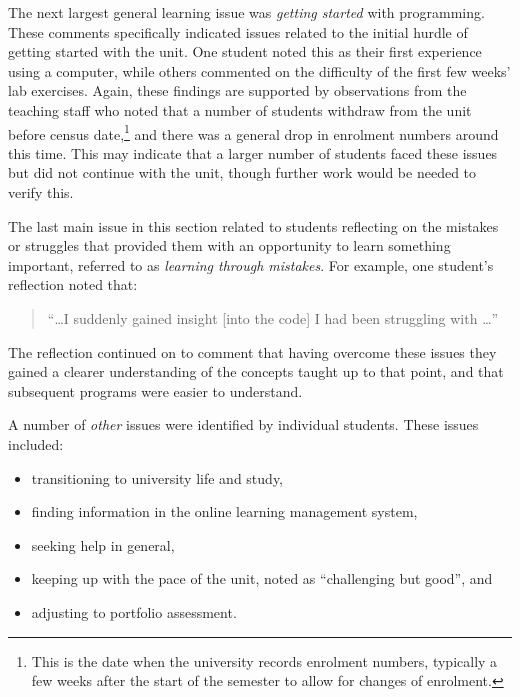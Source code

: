 The next largest general learning issue was \emph{getting started} with programming. These comments specifically indicated issues related to the initial hurdle of getting started with the unit. One student noted this as their first experience using a computer, while others commented on the difficulty of the first few weeks' lab exercises. Again, these findings are supported by observations from the teaching staff who noted that a number of students withdraw from the unit before census date,\footnote{This is the date when the university records enrolment numbers, typically a few weeks after the start of the semester to allow for changes of enrolment.} and there was a general drop in enrolment numbers around this time. This may indicate that a larger number of students faced these issues but did not continue with the unit, though further work would be needed to verify this.


The last main issue in this section related to students reflecting on the mistakes or struggles that provided them with an opportunity to learn something important, referred to as \emph{learning through mistakes}. For example, one student's reflection noted that:

\begin{quote}
``\ldots I suddenly gained insight [into the code] I had been struggling with \ldots''
\end{quote}

\noindent The reflection continued on to comment that having overcome these issues they gained a clearer understanding of the concepts taught up to that point, and that subsequent programs were easier to understand. 

A number of \emph{other} issues were identified by individual students. These issues included: 
\begin{itemize}[noitemsep,nolistsep]
	\item transitioning to university life and study,
	\item finding information in the online learning management system,
	\item seeking help in general,
	\item keeping up with the pace of the unit, noted as ``challenging but good'', and
	\item adjusting to portfolio assessment.
\end{itemize}


